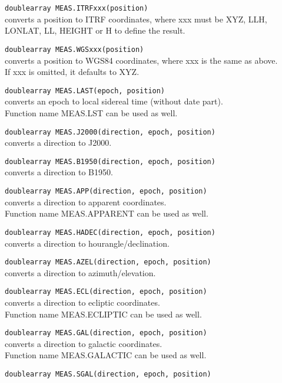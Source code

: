 \begin{description}
  \item[] \texttt{doublearray MEAS.ITRFxxx(position)}\\
    converts a position to ITRF coordinates, where xxx must be XYZ,
    LLH, LONLAT, LL, HEIGHT or H to define the result.
  \item[] \texttt{doublearray MEAS.WGSxxx(position)}\\
    converts a position to WGS84 coordinates, where xxx is the same as
    above. If xxx is omitted, it defaults to XYZ.
  \item[] \texttt{doublearray MEAS.LAST(epoch, position)}\\
    converts an epoch to local sidereal time (without date part).
    \\Function name MEAS.LST can be used as well.
  \item[] \texttt{doublearray MEAS.J2000(direction, epoch, position)}\\
    converts a direction to J2000.
  \item[] \texttt{doublearray MEAS.B1950(direction, epoch, position)}\\
    converts a direction to B1950.
  \item[] \texttt{doublearray MEAS.APP(direction, epoch, position)}\\
    converts a direction to apparent coordinates.
    \\Function name MEAS.APPARENT can be used as well.
  \item[] \texttt{doublearray MEAS.HADEC(direction, epoch, position)}\\
    converts a direction to hourangle/declination.
  \item[] \texttt{doublearray MEAS.AZEL(direction, epoch, position)}\\
    converts a direction to azimuth/elevation.
  \item[] \texttt{doublearray MEAS.ECL(direction, epoch, position)}\\
    converts a direction to ecliptic coordinates.
    \\Function name MEAS.ECLIPTIC can be used as well.
  \item[] \texttt{doublearray MEAS.GAL(direction, epoch, position)}\\
    converts a direction to galactic coordinates.
    \\Function name MEAS.GALACTIC can be used as well.
  \item[] \texttt{doublearray MEAS.SGAL(direction, epoch, position)}\\

\end{description}
